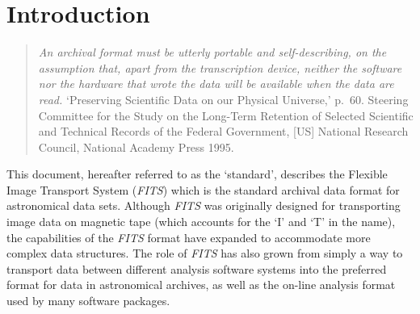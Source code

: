 \documentclass[11pt,makeidx]{book}     %
\begin{document}

		  
\setcounter{page}{0}

\tableofcontents
\listoftables


\chapter{Introduction}

\setcounter{page}{1}

\begin{quote}
{\em An {\em archival format} must be utterly portable and
self-describing, on the assumption that, apart from the transcription
device, neither the software nor the hardware that wrote the data will
be available when the data are read.} 
{`Preserving Scientific Data on
our Physical Universe,' p.\ 60.} {Steering Committee for the Study on the
Long-Term Retention of Selected Scientific and Technical Records of the
Federal Government, [US] National Research Council, National Academy
Press 1995.}
\end{quote}

   This document, hereafter referred to as the `standard',  describes the
   Flexible Image Transport System ({\em FITS\/}) which is the standard
   archival data format for astronomical data sets. Although {\em FITS\/}
   was originally designed for transporting image data on magnetic tape
   (which accounts for the `I' and `T' in the name), the capabilities of
   the {\em FITS\/} format have expanded to  accommodate more complex data
   structures.   The role of {\em FITS\/} has also grown from simply a way to
   transport data between different  analysis software systems into the
   preferred format for data in astronomical archives, as well as the
   on-line analysis format used by many software packages.
\end{document}

